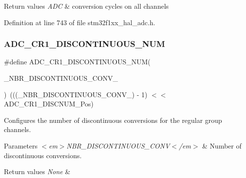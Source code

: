 \begin{DoxyRetVals}{Return values}
{\em A\+DC} & conversion cycles on all channels \\
\hline
\end{DoxyRetVals}


Definition at line 743 of file stm32f1xx\+\_\+hal\+\_\+adc.\+h.

\mbox{\label{group___a_d_c___private___macros_gaf52092c7978306ff922b2a6b42087472}} 
\subsubsection{\texorpdfstring{A\+D\+C\+\_\+\+C\+R1\+\_\+\+D\+I\+S\+C\+O\+N\+T\+I\+N\+U\+O\+U\+S\+\_\+\+N\+UM}{ADC\_CR1\_DISCONTINUOUS\_NUM}}
{\footnotesize\ttfamily \#define A\+D\+C\+\_\+\+C\+R1\+\_\+\+D\+I\+S\+C\+O\+N\+T\+I\+N\+U\+O\+U\+S\+\_\+\+N\+UM(\begin{DoxyParamCaption}\item[{}]{\+\_\+\+N\+B\+R\+\_\+\+D\+I\+S\+C\+O\+N\+T\+I\+N\+U\+O\+U\+S\+\_\+\+C\+O\+N\+V\+\_\+ }\end{DoxyParamCaption})~(((\+\_\+\+N\+B\+R\+\_\+\+D\+I\+S\+C\+O\+N\+T\+I\+N\+U\+O\+U\+S\+\_\+\+C\+O\+N\+V\+\_\+) -\/ 1) $<$$<$ A\+D\+C\+\_\+\+C\+R1\+\_\+\+D\+I\+S\+C\+N\+U\+M\+\_\+\+Pos)}



Configures the number of discontinuous conversions for the regular group channels. 


\begin{DoxyParams}{Parameters}
{\em $<$em$>$\+N\+B\+R\+\_\+\+D\+I\+S\+C\+O\+N\+T\+I\+N\+U\+O\+U\+S\+\_\+\+C\+O\+N\+V$<$/em$>$} & Number of discontinuous conversions. \\
\hline
\end{DoxyParams}

\begin{DoxyRetVals}{Return values}
{\em None} & \\
\hline
\end{DoxyRetVals}


